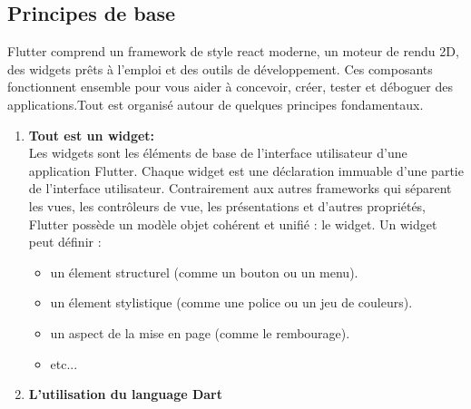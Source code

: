 \newpage


\newpage
\subsection{Principes de base}
Flutter comprend un framework de style react moderne, un moteur de rendu 2D, des widgets prêts à l’emploi et des outils de développement. Ces composants fonctionnent ensemble pour vous aider à concevoir, créer, tester et déboguer des applications.Tout est organisé autour de quelques principes fondamentaux.
\begin{enumerate}
    \item \textbf{Tout est un widget: }\\
          Les widgets sont les éléments de base de l’interface utilisateur d’une application Flutter. Chaque widget est une déclaration immuable d’une partie de l’interface utilisateur. Contrairement aux autres frameworks qui séparent les vues, les contrôleurs de vue, les présentations et d’autres propriétés, Flutter possède un modèle objet cohérent et unifié : le widget. Un widget peut
          définir :
          \begin{itemize}
              \item un élement structurel (comme un bouton ou un menu).
              \item un élement stylistique (comme une police ou un jeu de couleurs).
              \item un aspect de la mise en page (comme le rembourage).
              \item etc...
          \end{itemize} 
          
          \item \textbf{L'utilisation du language Dart}\\
       

\end{enumerate}
